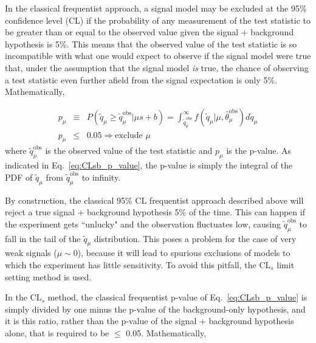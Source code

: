 \documentclass[dissertation.tex]{subfiles}
\begin{document}
In the classical frequentist approach, a signal model may be excluded at the 95\% confidence level (CL) if the probability of any measurement of the test statistic to be greater than or equal to the observed value given the signal + background hypothesis is 5\%.  This means that the observed value of the test statistic is so incompatible with what one would expect to observe if the signal model were true that, under the assumption that the signal model \textit{is} true, the chance of observing a test statistic even further afield from the signal expectation is only 5\%.  Mathematically, 

\begin{eqnarray}
\label{eq:CLsb_p_value}
p_{\mu} &\equiv& P(\tilde{q}_{\mu} \geq \tilde{q}_{\mu}^{\mathrm{obs}} | \mu s + b) = \int_{\tilde{q}_{\mu}^{\mathrm{obs}}}^{\infty} f(\tilde{q}_{\mu} | \mu, \hat{\theta}_{\mu}^{\mathrm{obs}}) d\tilde{q}_{\mu} \\
p_{\mu} &\leq& 0.05 \Rightarrow \mbox{exclude }\mu \nonumber
\end{eqnarray}
%
where $\tilde{q}_{\mu}^{\mathrm{obs}}$ is the observed value of the test statistic and $p_{\mu}$ is the p-value.  As indicated in Eq.~\ref{eq:CLsb_p_value}, the p-value is simply the integral of the PDF of $\tilde{q}_{\mu}$ from $\tilde{q}_{\mu}^{\mathrm{obs}}$ to infinity.

By construction, the classical 95\% CL frequentist approach described above will reject a true signal + background hypothesis 5\% of the time.  This can happen if the experiment gets ``unlucky" and the observation fluctuates low, causing $\tilde{q}_{\mu}^{\mathrm{obs}}$ to fall in the tail of the $\tilde{q}_{\mu}$ distribution.  This poses a problem for the case of very weak signals ($\mu \sim 0$), because it will lead to spurious exclusions of models to which the experiment has little sensitivity.  To avoid this pitfall, the $\mbox{CL}_{s}$ limit setting method is used.

In the $\mbox{CL}_{s}$ method, the classical frequentist p-value of Eq.~\ref{eq:CLsb_p_value} is simply divided by one minus the p-value of the background-only hypothesis, and it is this ratio, rather than the p-value of the signal + background hypothesis alone, that is required to be $\leq$ 0.05.  Mathematically, 
\end{document}
